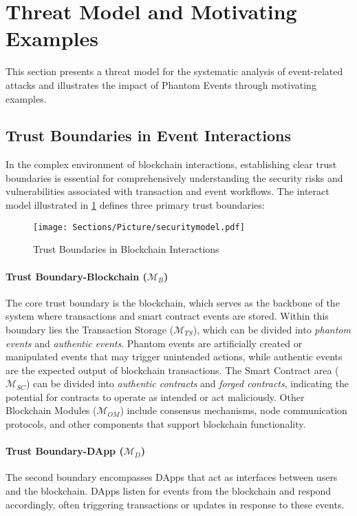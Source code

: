 \section{Threat Model and Motivating Examples}\label{sec:threat}

This section presents a threat model for the systematic analysis of event-related attacks and illustrates the impact of Phantom Events through motivating examples.
\subsection{Trust Boundaries in Event Interactions}

In the complex environment of blockchain interactions, establishing clear trust boundaries is essential for comprehensively understanding the security risks and vulnerabilities associated with transaction and event workflows. The interact model illustrated in \cref{fig:system model} defines three primary trust boundaries:
\begin{figure}[t]
    \centering
    \texttt{[image: Sections/Picture/securitymodel.pdf]}
    \caption{Trust Boundaries in Blockchain Interactions}
    \label{fig:system model}
\end{figure}

\paragraph{Trust Boundary-Blockchain (\(\bm{\mathcal{M}}_B\))}
The core trust boundary is the blockchain, which serves as the backbone of the system where transactions and smart contract events are stored.
Within this boundary lies the Transaction Storage (\(\bm{\mathcal{M}}_{TS}\)), which can be divided into \emph{phantom events} and \emph{authentic events}.
Phantom events are artificially created or manipulated events that may trigger unintended actions, while authentic events are the expected output of blockchain transactions.
The Smart Contract area (\(\bm{\mathcal{M}}_{SC}\)) can be divided into \emph{authentic contracts} and \emph{forged contracts}, indicating the potential for contracts to operate as intended or act maliciously.
Other Blockchain Modules (\(\bm{\mathcal{M}}_{OM}\)) include consensus mechanisms, node communication protocols, and other components that support blockchain functionality.

\paragraph{Trust Boundary-DApp (\(\bm{\mathcal{M}}_{D}\))}
The second boundary encompasses DApps that act as interfaces between users and the blockchain.
DApps listen for events from the blockchain and respond accordingly, often triggering transactions or updates in response to these events.


